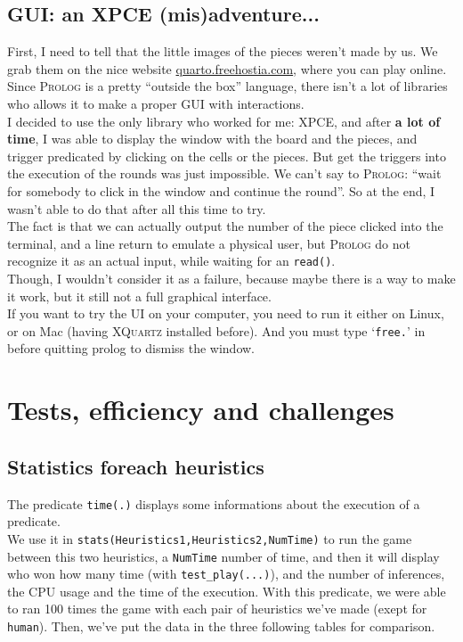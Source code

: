 \documentclass[a4paper,11pt]{article}
\newcommand{\tw}[1]{\texttt{#1}}
\begin{document}
		\subsection{GUI: an XPCE (mis)adventure...}
			First, I need to tell that the little images of the pieces weren't made by us. We grab them on the nice website \href{http://quarto.freehostia.com/en/}{quarto.freehostia.com}, where you can play online. \\
			Since \textsc{Prolog} is a pretty ``outside the box'' language, there isn't a lot of libraries who allows it to make a proper GUI with interactions. \\
			I decided to use the only library who worked for me: \textsc{XPCE}, and after \textbf{a lot of time}, I was able to display the window with the board and the pieces, and trigger predicated by clicking on the cells or the pieces. But get the triggers into the execution of the rounds was just impossible. We can't say to \textsc{Prolog}: ``wait for somebody to click in the window and continue the round''. So at the end, I wasn't able to do that after all this time to try. \\
			The fact is that we can actually output the number of the piece clicked into the terminal, and a line return to emulate a physical user, but \textsc{Prolog} do not recognize it as an actual input, while waiting for an \tw{read()}. \\
			Though, I wouldn't consider it as a failure, because maybe there is a way to make it work, but it still not a full graphical interface. \\
			If you want to try the UI on your computer, you need to run it either on Linux, or on Mac (having \textsc{XQuartz} installed before). And you must type `\tw{free.}' in before quitting prolog to dismiss the window.
	
	\section{Tests, efficiency and challenges}	
		\subsection{Statistics foreach heuristics}
			The predicate \tw{time(.)} displays some informations about the execution of a predicate. \\
			We use it in \tw{stats(Heuristics1,Heuristics2,NumTime)} to run the game between this two heuristics, a \tw{NumTime} number of time, and then it will display who won how many time (with \tw{test\_play(...)}), and the number	of inferences, the CPU usage and the time of the execution. With this predicate, we were able to ran 100 times the game with each pair of heuristics we've made (exept for \tw{human}). Then, we've put the data in the three following tables for comparison.
\end{document}
